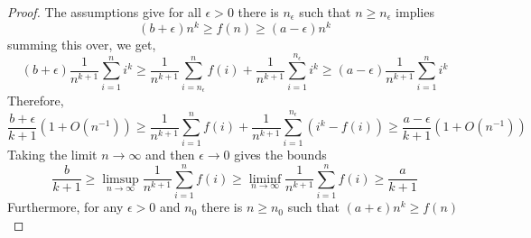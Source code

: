 \documentclass[main.tex]{subfiles}
\begin{document}
\begin{proof}
The assumptions give for all $\epsilon > 0$ there is $n_\epsilon$ such that $n \ge n_\epsilon$ implies
\[ (b + \epsilon) n^k \ge f(n) \ge (a - \epsilon) n^k \]
summing this over, we get,
\[ (b + \epsilon) \frac{1}{n^{k+1}} \sum_{i = 1}^n i^k \ge \frac{1}{n^{k+1}} \sum_{i = n_\epsilon}^n f(i) + \frac{1}{n^{k+1}} \sum_{i = 1}^{n_\epsilon} i^k \ge (a - \epsilon) \frac{1}{n^{k+1}} \sum_{i = 1}^n i^k \]
Therefore,
\[ \frac{b + \epsilon}{k + 1} (1 + O(n^{-1})) \ge \frac{1}{n^{k+1}} \sum_{i = 1}^n f(i) + \frac{1}{n^{k+1}} \sum_{i = 1}^{n_\epsilon} (i^k - f(i)) \ge \frac{a - \epsilon}{k+1} (1 + O(n^{-1}))  \]
Taking the limit $n \to \infty$ and then $\epsilon \to 0$ gives the bounds
\[ \frac{b}{k+1} \ge \limsup_{n \to \infty} \frac{1}{n^{k+1}} \sum_{i = 1}^n f(i) \ge \liminf_{n \to \infty} \frac{1}{n^{k+1}} \sum_{i = 1}^n f(i) \ge \frac{a}{k+1}  \]
Furthermore, for any $\epsilon > 0$ and $n_0$ there is $n \ge n_0$ such that $(a + \epsilon) n^k \ge f(n)$
\end{proof}


\ifSubfilesClassLoaded{%
  
  
}{}
\end{document}
